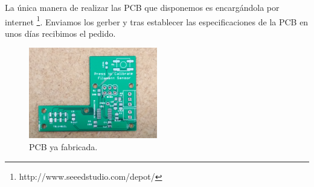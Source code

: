 La única manera de realizar las PCB que disponemos es encargándola por internet \footnote{http://www.seeedstudio.com/depot/}. Enviamos los gerber y tras establecer las especificaciones de la PCB en unos días recibimos el pedido.

   \begin{figure}[H]
            \centering
            \includegraphics[width=0.5\textwidth]{images/sensor/IMG_20150414_105219_.jpg}
            \caption{PCB ya fabricada.}
            \label{fig:sens_pcb}
    \end{figure}

